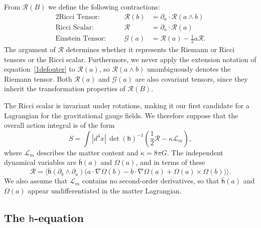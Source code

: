 \documentclass[a4paper]{article}
\numberwithin{equation}{section}
\newcommand{\dt}{\! \cdot \!}
\newcommand{\wdg}{\! \wedge \!}
\newcommand{\crs}{\! \times \!}
\newcommand{\la}{\langle}
\newcommand{\ra}{\rangle}
\newcommand{\half}{{\textstyle \frac{1}{2}}}
\newcommand{\Om}{\Omega}
\newcommand{\clg}{{\mathcal{G}}}
\newcommand{\cll}{{\mathcal{L}}}
\newcommand{\clr}{{\mathcal{R}}}
\newcommand{\da}{\partial_a}
\newcommand{\db}{\partial_b}
\newcommand{\lih}{\mathsf{h}}
\newcommand{\lbh}{\bar{\mathsf{h}}}
\newcommand{\ho}{\lbh}
\newcommand{\hu}{\lih}
\newcommand{\grad}{\nabla}
\newcommand{\dhi}{\det(\hu)^{-1}}
\begin{document}
From $\clr(B)$ we define the following contractions:
%
\begin{alignat}{2}
\mbox{Ricci Tensor:}& & \quad  \clr(b)&= \da \dt \clr(a \wdg b) \\
\mbox{Ricci Scalar:}& & \quad \clr &= \da \dt \clr(a) \\
\mbox{Einstein Tensor:}& &\quad \clg(a)&= \clr(a) - \half a \clr.
\end{alignat}
%
The argument of $\clr$ determines whether it represents the Riemann or
Ricci tensors or the Ricci scalar.  Furthermore, we never apply the
extension notation of equation~\eqref{1defouter} to $\clr(a)$, so
$\clr(a \wedge b)$ unambiguously denotes the Riemann tensor.  Both
$\clr(a)$ and $\clg(a)$ are also covariant tensors, since they inherit
the transformation properties of $\clr(B)$.


The Ricci scalar is invariant under rotations, making it our first
candidate for a Lagrangian for the gravitational gauge fields.  We
therefore suppose that the overall action integral is of the form
%
\begin{equation}
S = \int |d^4x| \, \dhi (\half \clr - \kappa \cll_m),
\label{F-act}
\end{equation}
%
where $\cll_m$ describes the matter content and $\kappa=8 \pi G$.  The
independent dynamical variables are $\ho(a)$ and $\Om(a)$, and in
terms of these
%
\begin{equation}
\clr = \big\la \ho(\db \wdg \da) \bigl(a \dt \grad \Om(b) - b \dt \grad \Om(a)
+ \Om(a) \crs \Om(b)\bigr) \big\ra.
\end{equation}
%
We also assume that $\cll_m$ contains no second-order derivatives, so
that $\ho(a)$ and $\Om(a)$ appear undifferentiated in the matter Lagrangian.  


\subsection[The $\hu$-equation]{The  $\hu$-equation}
\end{document}
